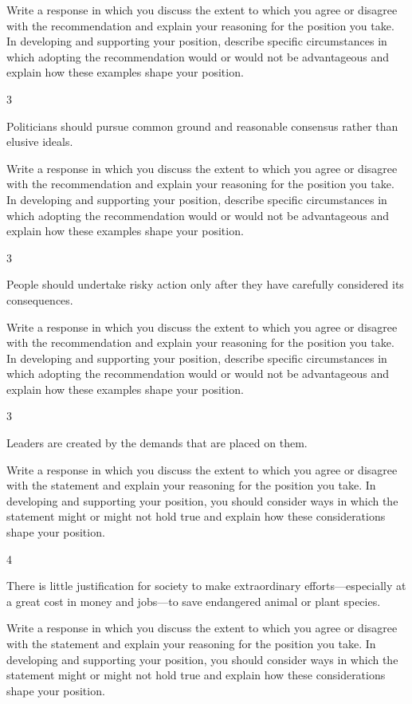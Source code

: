 \documentclass[]{article}
\begin{document}
Write a response in which you discuss the extent to which you agree or
disagree with the recommendation and explain your reasoning for the
position you take. In developing and supporting your position, describe
specific circumstances in which adopting the recommendation would or
would not be advantageous and explain how these examples shape your
position.

3

Politicians should pursue common ground and reasonable consensus rather
than elusive ideals.

Write a response in which you discuss the extent to which you agree or
disagree with the recommendation and explain your reasoning for the
position you take. In developing and supporting your position, describe
specific circumstances in which adopting the recommendation would or
would not be advantageous and explain how these examples shape your
position.

3

People should undertake risky action only after they have carefully
considered its consequences.

Write a response in which you discuss the extent to which you agree or
disagree with the recommendation and explain your reasoning for the
position you take. In developing and supporting your position, describe
specific circumstances in which adopting the recommendation would or
would not be advantageous and explain how these examples shape your
position.

3

Leaders are created by the demands that are placed on them.

Write a response in which you discuss the extent to which you agree or
disagree with the statement and explain your reasoning for the position
you take. In developing and supporting your position, you should
consider ways in which the statement might or might not hold true and
explain how these considerations shape your position.

4

There is little justification for society to make extraordinary
efforts---especially at a great cost in money and jobs---to save
endangered animal or plant species.

Write a response in which you discuss the extent to which you agree or
disagree with the statement and explain your reasoning for the position
you take. In developing and supporting your position, you should
consider ways in which the statement might or might not hold true and
explain how these considerations shape your position.
\end{document}
